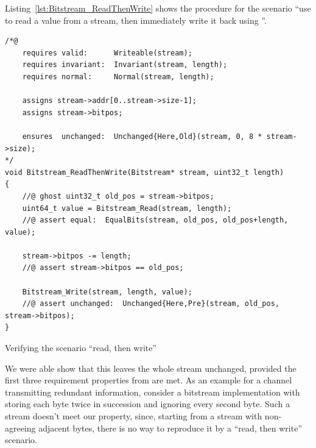\FloatBarrier

%
Listing~\ref{lst:Bitstream_ReadThenWrite}
shows the procedure for the scenario ``use 
to read a value from a stream, then immediately write it back using
''.




\begin{listing}[hbt]
\begin{minipage}{0.99\textwidth}
\begin{lstlisting}[style=acsl-block]
/*@
    requires valid:      Writeable(stream);
    requires invariant:  Invariant(stream, length);
    requires normal:     Normal(stream, length);

    assigns stream->addr[0..stream->size-1];
    assigns stream->bitpos;

    ensures  unchanged:  Unchanged{Here,Old}(stream, 0, 8 * stream->size);
*/
void Bitstream_ReadThenWrite(Bitstream* stream, uint32_t length)
{
    //@ ghost uint32_t old_pos = stream->bitpos;
    uint64_t value = Bitstream_Read(stream, length);
    //@ assert equal:  EqualBits(stream, old_pos, old_pos+length, value);

    stream->bitpos -= length;
    //@ assert stream->bitpos == old_pos;

    Bitstream_Write(stream, length, value);
    //@ assert unchanged:  Unchanged{Here,Pre}(stream, old_pos, stream->bitpos);
}
\end{lstlisting}
\end{minipage}
\caption{\label{lst:Bitstream_ReadThenWrite}
	Verifying the scenario ``read, then write'' }
\end{listing}


\FloatBarrier


We were able show that this leaves the
whole stream unchanged, provided the first three requirement properties
from  are met.
%
As an example for a channel transmitting redundant information,
consider
a bitstream implementation
with 
storing each byte twice in succession and 
ignoring every second byte.
%
Such a stream doesn't meet our property, since, 
starting from a stream with non-agreeing adjacent bytes, there is no
way to reproduce it by a ``read, then write'' scenario.

